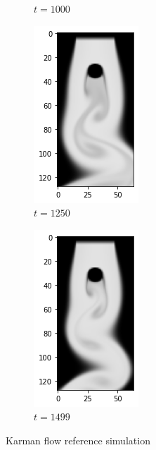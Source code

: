 \documentclass[a4paper,12pt,twoside]{report}
\begin{document}
\begin{figure}
\begin{subfigure}{0.18\textwidth}
		\caption{$t=1000$}
	\end{subfigure}
	\begin{subfigure}{0.18\textwidth}
		\centering
		\includegraphics[scale=0.5]{karmanflow/ref_density_001250.png}
		\caption{$t=1250$}
	\end{subfigure}
	\begin{subfigure}{0.18\textwidth}
		\centering
		\includegraphics[scale=0.5]{karmanflow/ref_density_001499.png}
		\caption{$t=1499$}
	\end{subfigure}
	\caption{Karman flow reference simulation}
	\label{sol karman high ref}
\end{figure}
\end{document}
